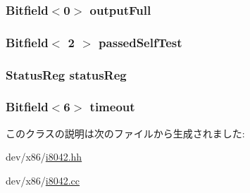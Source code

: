 \label{classX86ISA_1_1I8042_afa7b02fd8bda5e1de413e0b8776294ad}
\hypertarget{classX86ISA_1_1I8042_a7f94b3d2e2e3de211854f0645c7e0ec6}{
\subsubsection[{outputFull}]{\setlength{\rightskip}{0pt plus 5cm}Bitfield$<$0$>$ {\bf outputFull}}}
\label{classX86ISA_1_1I8042_a7f94b3d2e2e3de211854f0645c7e0ec6}
\hypertarget{classX86ISA_1_1I8042_a0a84c3649aab70a73e2c963a742a4643}{
\subsubsection[{passedSelfTest}]{\setlength{\rightskip}{0pt plus 5cm}Bitfield$<$ 2 $>$ {\bf passedSelfTest}}}
\label{classX86ISA_1_1I8042_a0a84c3649aab70a73e2c963a742a4643}
\hypertarget{classX86ISA_1_1I8042_a08336c94695c08fbcf6cb02060bd9b94}{
\subsubsection[{statusReg}]{\setlength{\rightskip}{0pt plus 5cm}StatusReg {\bf statusReg}}}
\label{classX86ISA_1_1I8042_a08336c94695c08fbcf6cb02060bd9b94}
\hypertarget{classX86ISA_1_1I8042_a1e751f93440ec6b2aa8aba4c7336d6ea}{
\subsubsection[{timeout}]{\setlength{\rightskip}{0pt plus 5cm}Bitfield$<$6$>$ {\bf timeout}}}
\label{classX86ISA_1_1I8042_a1e751f93440ec6b2aa8aba4c7336d6ea}


このクラスの説明は次のファイルから生成されました:\begin{DoxyCompactItemize}
\item 
dev/x86/\hyperlink{i8042_8hh}{i8042.hh}\item 
dev/x86/\hyperlink{i8042_8cc}{i8042.cc}\end{DoxyCompactItemize}
